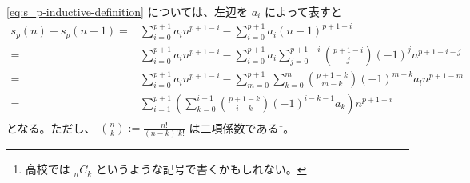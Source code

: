 {\autoref{eq:s_p-inductive-definition} については、左辺を $a_i$ によって表すと
\begin{align*}
  s_p(n)-s_p(n-1)
  =&\sum_{i=0}^{p+1} a_i n^{p+1-i}-\sum_{i=0}^{p+1} a_i (n-1)^{p+1-i} \\
  =&\sum_{i=0}^{p+1} a_i n^{p+1-i}-\sum_{i=0}^{p+1} a_i \sum_{j=0}^{p+1-i} \binom{p+1-i}{j} (-1)^j n^{p+1-i-j} \\
  =&\sum_{i=0}^{p+1} a_i n^{p+1-i}-\sum_{m=0}^{p+1} \sum_{k=0}^{m} \binom{p+1-k}{m-k} (-1)^{m-k} a_l n^{p+1-m} \\
  =&\sum_{i=1}^{p+1} \left(\sum_{k=0}^{i-1} \binom{p+1-k}{i-k} (-1)^{i-k-1} a_k\right) n^{p+1-i}
\end{align*}
となる。ただし、 $\binom{n}{k}:=\frac{n!}{(n-k)!k!}$ は二項係数である\footnote{高校では ${}_n C_k$ というような記号で書くかもしれない。}。

}

